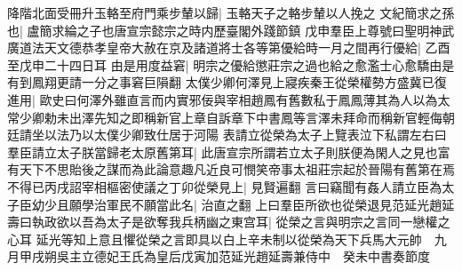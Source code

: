 降階北面受冊升玉輅至府門乘步輦以歸|{
	玉輅天子之輅步輦以人挽之}
文紀簡求之孫也|{
	盧簡求綸之子也唐宣宗懿宗之時内歷臺閣外踐節鎮}
戊申羣臣上尊號曰聖明神武廣道法天文德恭孝皇帝大赦在京及諸道將士各等第優給時一月之間再行優給|{
	乙酉至戊申二十四日耳}
由是用度益窘|{
	明宗之優給懲莊宗之過也給之愈濫士心愈驕由是有到鳳翔更請一分之事窘巨隕翻}
太僕少卿何澤見上寢疾秦王從榮權勢方盛冀已復進用|{
	歐史曰何澤外雖直言而内實邪佞與宰相趙鳳有舊數私于鳳鳳薄其為人以為太常少卿勅未出澤先知之即稱新官上章自訴章下中書鳳等言澤未拜命而稱新官輕侮朝廷請坐以法乃以太僕少卿致仕居于河陽}
表請立從榮為太子上覽表泣下私謂左右曰羣臣請立太子朕當歸老太原舊第耳|{
	此唐宣宗所謂若立太子則朕便為閑人之見也富有天下不思貽後之謀而為此論意趣凡近良可憫笑帝事太祖莊宗起於晉陽有舊第在焉}
不得已丙戌詔宰相樞密使議之丁卯從榮見上|{
	見賢遍翻}
言曰竊聞有姦人請立臣為太子臣幼少且願學治軍民不願當此名|{
	治直之翻}
上曰羣臣所欲也從榮退見范延光趙延壽曰執政欲以吾為太子是欲奪我兵柄幽之東宫耳|{
	從榮之言與明宗之言同一戀權之心耳}
延光等知上意且懼從榮之言即具以白上辛未制以從榮為天下兵馬大元帥　九月甲戌朔吳主立德妃王氏為皇后戊寅加范延光趙延壽兼侍中　癸未中書奏節度

